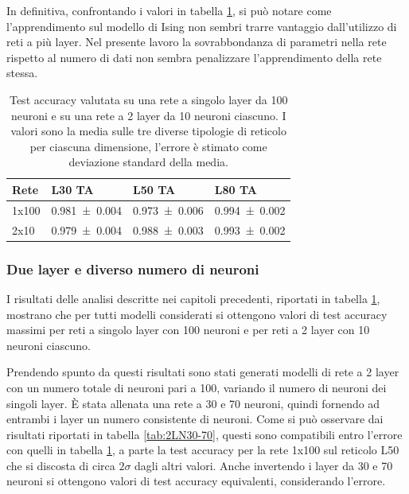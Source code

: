 \documentclass{article}
\begin{document}
In definitiva, confrontando i valori in tabella \ref{tab:NNLN}, si può notare come l'apprendimento sul modello di Ising non sembri trarre vantaggio dall'utilizzo di reti a più layer.
Nel presente lavoro la sovrabbondanza di parametri nella rete rispetto al numero di dati non sembra penalizzare l'apprendimento della rete stessa.

\begin{table}[ht]
\begin{center}
\begin{tabular}{llll}
\toprule
Rete & L30 TA & L50 TA & L80 TA \\
\midrule
1x100 & \num{0.981 \pm 0.004} & \num{0.973 \pm 0.006} & \num{0.994 \pm 0.002} \\
2x10 & \num{0.979 \pm 0.004} & \num{0.988 \pm 0.003} & \num{0.993 \pm 0.002} \\
\bottomrule
\end{tabular}
\end{center}
\caption{Test accuracy valutata su una rete a singolo layer da 100 neuroni e su una rete a 2 layer da 10 neuroni ciascuno. I valori sono la media sulle tre diverse tipologie di reticolo per ciascuna dimensione, l'errore è stimato come deviazione standard della media.}
\label{tab:NNLN}
\end{table}

\subsubsection{Due layer e diverso numero di neuroni}\label{sec:2Ln}
I risultati delle analisi descritte nei capitoli precedenti, riportati in tabella \ref{tab:NNLN}, mostrano che per tutti modelli considerati si ottengono valori di test accuracy massimi per reti a singolo layer con 100 neuroni e per reti a 2 layer con 10 neuroni ciascuno.

Prendendo spunto da questi risultati sono stati generati modelli di rete a 2 layer con un numero totale di neuroni pari a 100, variando il numero di neuroni dei singoli layer.
È stata allenata una rete a 30 e 70 neuroni, quindi fornendo ad entrambi i layer un numero consistente di neuroni.
Come si può osservare dai risultati riportati in tabella \ref{tab:2LN30-70}, questi sono compatibili entro l'errore con quelli in tabella \ref{tab:NNLN}, a parte la test accuracy per la rete 1x100 sul reticolo L50 che si discosta di circa $2\sigma$ dagli altri valori.
Anche invertendo i layer da 30 e 70 neuroni si ottengono valori di test accuracy equivalenti, considerando l'errore.
\end{document}
